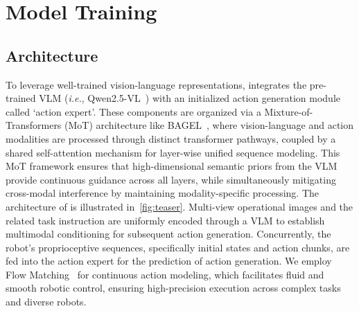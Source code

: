 \section{Model Training}
\subsection{Architecture}
To leverage well-trained vision-language representations, \method integrates the pre-trained VLM (\textit{i.e.}, Qwen2.5-VL~\cite{bai2025qwen2}) with an initialized action generation module called `action expert'. These components are organized via a Mixture-of-Transformers (MoT) architecture like BAGEL~\cite{deng2025emerging}, where vision-language and action modalities are processed through distinct transformer pathways, coupled by a shared self-attention mechanism for layer-wise unified sequence modeling. This MoT framework ensures that high-dimensional semantic priors from the VLM provide continuous guidance across all layers, while simultaneously mitigating cross-modal interference by maintaining modality-specific processing. The architecture of \method is illustrated in~\cref{fig:teaser}. Multi-view operational images and the related task instruction are uniformly encoded through a VLM to establish multimodal conditioning for subsequent action generation. Concurrently, the robot's proprioceptive sequences, specifically initial states and action chunks, are fed into the action expert for the prediction of action generation. We employ Flow Matching~\cite{lipman2022flow} for continuous action modeling, which facilitates fluid and smooth robotic control, ensuring high-precision execution across complex tasks and diverse robots.


